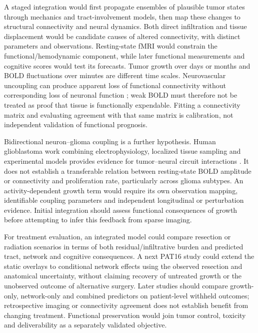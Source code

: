 A staged integration would first propagate ensembles of plausible tumor states through mechanics and tract-involvement models, then map these changes to structural connectivity and neural dynamics. Both direct infiltration and tissue displacement would be candidate causes of altered connectivity, with distinct parameters and observations. Resting-state fMRI would constrain the functional/hemodynamic component, while later functional measurements and cognitive scores would test its forecasts. Tumor growth over days or months and BOLD fluctuations over minutes are different time scales. Neurovascular uncoupling can produce apparent loss of functional connectivity without corresponding loss of neuronal function \citep{sun2020}; weak BOLD must therefore not be treated as proof that tissue is functionally expendable. Fitting a connectivity matrix and evaluating agreement with that same matrix is calibration, not independent validation of functional prognosis.

Bidirectional neuron--glioma coupling is a further hypothesis. Human glioblastoma work combining electrophysiology, localized tissue sampling and experimental models provides evidence for tumor--neural circuit interactions \citep{krishna2023}. It does not establish a transferable relation between resting-state BOLD amplitude or connectivity and proliferation rate, particularly across glioma subtypes. An activity-dependent growth term would require its own observation mapping, identifiable coupling parameters and independent longitudinal or perturbation evidence. Initial integration should assess functional consequences of growth before attempting to infer this feedback from sparse imaging.

For treatment evaluation, an integrated model could compare resection or radiation scenarios in terms of both residual/infiltrative burden and predicted tract, network and cognitive consequences. A next PAT16 study could extend the static overlays to conditional network effects using the observed resection and anatomical uncertainty, without claiming recovery of untreated growth or the unobserved outcome of alternative surgery. Later studies should compare growth-only, network-only and combined predictors on patient-level withheld outcomes; retrospective imaging or connectivity agreement does not establish benefit from changing treatment. Functional preservation would join tumor control, toxicity and deliverability as a separately validated objective.

